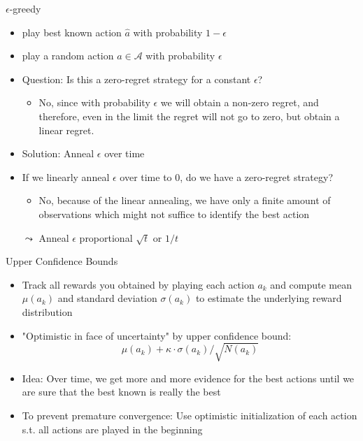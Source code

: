 \documentclass[aspectratio=169]{../latex_main/tntbeamer}  %
\begin{document}
\begin{frame}[c]{$\epsilon$-greedy}
	
	\begin{itemize}
		\item play best known action $\hat{a}$ with probability $1-\epsilon$
		\item play a random action $a \in \mathcal{A}$ with probability $\epsilon$ 
		\smallskip
		\item Question: Is this a zero-regret strategy for a constant $\epsilon$?
		\pause
		\begin{itemize}
			\item No, since with probability $\epsilon$ we will obtain a non-zero regret, and therefore, even in the limit the regret will not go to zero, but obtain a linear regret.
		\end{itemize}
		\smallskip\pause
		\item Solution: Anneal $\epsilon$ over time
		\item If we linearly anneal $\epsilon$ over time to $0$, do we have a zero-regret strategy?
		\pause
		\begin{itemize}
			\item No, because of the linear annealing, we have only a finite amount of observations which might not suffice to identify the best action
		\end{itemize}
		\smallskip
		\item[$\leadsto$] Anneal $\epsilon$ proportional $\sqrt{t}$ or $1/t$
	\end{itemize}
	
\end{frame}
\begin{frame}[c]{Upper Confidence Bounds}
	
	\begin{itemize}
		\item Track all rewards you obtained by playing each action $a_k$ and compute mean $\mu(a_k)$ and standard deviation $\sigma(a_k)$ to estimate the underlying reward distribution
		\item "Optimistic in face of uncertainty" by upper confidence bound:
		$$\mu(a_k) + \kappa \cdot \sigma(a_k) / \sqrt{N(a_k)}$$
		\item Idea: Over time, we get more and more evidence for the best actions until we are sure that the best known is really the best
		\medskip
		\pause
		\item To prevent premature convergence: Use optimistic initialization of each action\\ s.t. all actions are played in the beginning
	\end{itemize}
	
\end{frame}
\end{document}
